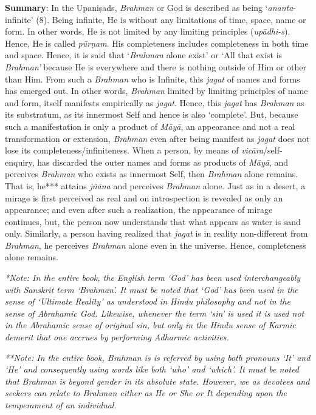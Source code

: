 \textbf{Summary}: In the Upaniṣads, \emph{Brahman} or God is described as being `\emph{ananta}-infinite' (8). Being infinite, He is without any limitations of time, space, name or form. In other words, He is not limited by any limiting principles (\emph{upādhi-s}). Hence, He is called \emph{pūrṇam}. His completeness includes completeness in both time and space. Hence, it is said that `\emph{Brahman} alone exist' or `All that exist is \emph{Brahman'} because He is everywhere and there is nothing outside of Him or other than Him. From such a \emph{Brahman} who is Infinite, this \emph{jagat} of names and forms has emerged out. In other words, \emph{Brahman} limited by limiting principles of name and form, itself manifests empirically as \emph{jagat}. Hence, this \emph{jagat} has \emph{Brahman} as its substratum, as its innermost Self and hence is also `complete'. But, because such a manifestation is only a product of \emph{Māyā}, an appearance and not a real transformation or extension, \emph{Brahman} even after being manifest as \emph{jagat} does not lose its completeness/infiniteness. When a person, by means of \emph{vicāra}/self-enquiry, has discarded the outer names and forms as products of \emph{Māyā}, and perceives \emph{Brahman} who exists as innermost Self, then \emph{Brahman} alone remains. That is, he*** attains \emph{jñāna} and perceives \emph{Brahman} alone. Just as in a desert, a mirage is first perceived as real and on introspection is revealed as only an appearance; and even after such a realization, the appearance of mirage continues, but, the person now understands that what appears as water is sand only. Similarly, a person having realized that \emph{jagat} is in reality non-different from \emph{Brahman}, he perceives \emph{Brahman} alone even in the universe. Hence, completeness alone remains.

\emph{*Note: In the entire book, the English term `God' has been used interchangeably with Sanskrit term `Brahman'. It must be noted that `God' has been used in the sense of `Ultimate Reality' as understood in Hindu philosophy and not in the sense of Abrahamic God. Likewise, whenever the term `sin' is used it is used not in the Abrahamic sense of original sin, but only in the Hindu sense of Karmic demerit that one accrues by performing Adharmic activities.}

\emph{**Note: In the entire book, Brahman is is referred by using both pronouns `It' and `He' and consequently using words like both `who' and `which'. It must be noted that Brahman is beyond gender in its absolute state. However, we as devotees and seekers can relate to Brahman either as He or She or It depending upon the temperament of an individual.}

